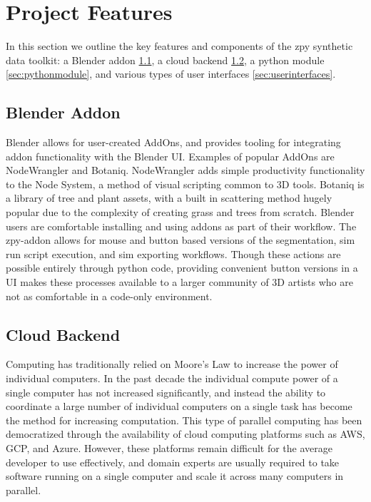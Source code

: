 \documentclass{article}
\begin{document}
\section{Project Features}
\label{sec:projectfeatures}

In this section we outline the key features and components of the zpy synthetic data toolkit: a Blender addon \ref{sec:blenderaddon}, a cloud backend \ref{sec:cloudbackend}, a python module \ref{sec:pythonmodule}, and various types of user interfaces \ref{sec:userinterfaces}.

\subsection{Blender Addon}
\label{sec:blenderaddon}

Blender allows for user-created AddOns, and provides tooling for integrating addon functionality with the Blender UI. Examples of popular AddOns are NodeWrangler and Botaniq. NodeWrangler adds simple productivity functionality to the Node System, a method of visual scripting common to 3D tools. Botaniq is a library of tree and plant assets, with a built in scattering method hugely popular due to the complexity of creating grass and trees from scratch. Blender users are comfortable installing and using addons as part of their workflow. The zpy-addon allows for mouse and button based versions of the segmentation, sim run script execution, and sim exporting workflows. Though these actions are possible entirely through python code, providing convenient button versions in a UI makes these processes available to a larger community of 3D artists who are not as comfortable in a code-only environment.

\subsection{Cloud Backend}
\label{sec:cloudbackend}

Computing has traditionally relied on Moore’s Law to increase the power of individual computers. In the past decade the individual compute power of a single computer has not increased significantly, and instead the ability to coordinate a large number of individual computers on a single task has become the method for increasing computation. This type of parallel computing has been democratized through the availability of cloud computing platforms such as AWS, GCP, and Azure. However, these platforms remain difficult for the average developer to use effectively, and domain experts are usually required to take software running on a single computer and scale it across many computers in parallel.
\end{document}
